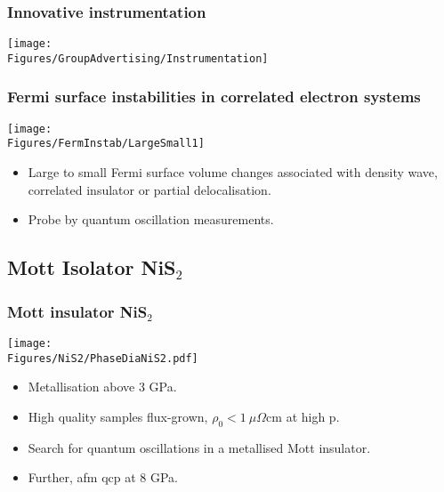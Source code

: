 

\begin{frame}[label=Methods]
\frametitle{Innovative instrumentation}
\centerline{\texttt{[image: \\Figures/GroupAdvertising/Instrumentation]}}
\end{frame}

\begin{frame}[label=FSInstabilities]
\frametitle{Fermi surface instabilities in correlated electron
  systems}
\centerline{\texttt{[image: \\Figures/FermInstab/LargeSmall1]}}
\begin{itemize}
\item
Large to small Fermi surface volume changes associated with density
wave, correlated insulator or partial delocalisation.

\item%
Probe by quantum oscillation measurements.

\end{itemize}
\end{frame}



\subsection{Mott Isolator NiS$_2$}
\begin{frame}[label=NiS2-1]
\frametitle{Mott insulator NiS$_2$}
\centerline{\texttt{[image: \\Figures/NiS2/PhaseDiaNiS2.pdf]}}

\begin{itemize}
\item
Metallisation above 3 GPa.

\item
High quality samples flux-grown, $\rho_0 < 1~\mu \Omega \mathrm {cm}$ at high p.

\item 
Search for quantum oscillations in a metallised Mott insulator.

\item
Further, afm qcp at 8 GPa.
\end{itemize}
\end{frame}



